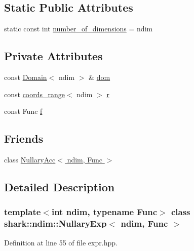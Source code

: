 \subsection*{Static Public Attributes}
\begin{DoxyCompactItemize}
\item 
static const int \hyperlink{classshark_1_1ndim_1_1_nullary_exp_ae586c786daf51061eb41615d208b2c12}{number\+\_\+of\+\_\+dimensions} = ndim
\end{DoxyCompactItemize}
\subsection*{Private Attributes}
\begin{DoxyCompactItemize}
\item 
const \hyperlink{classshark_1_1ndim_1_1_domain}{Domain}$<$ ndim $>$ \& \hyperlink{classshark_1_1ndim_1_1_nullary_exp_a4af666c034e0035ca4a9c4f8cf2f2ea2}{dom}
\item 
const \hyperlink{structshark_1_1ndim_1_1coords__range}{coords\+\_\+range}$<$ ndim $>$ \hyperlink{classshark_1_1ndim_1_1_nullary_exp_a2ab3c895de1618318f8864c90cd7b21e}{r}
\item 
const Func \hyperlink{classshark_1_1ndim_1_1_nullary_exp_a30f367c05cd7978aedec0a99ca82ed0e}{f}
\end{DoxyCompactItemize}
\subsection*{Friends}
\begin{DoxyCompactItemize}
\item 
class \hyperlink{classshark_1_1ndim_1_1_nullary_exp_aae3b9819be1b386ed4bb69e9a1e44726}{Nullary\+Acc$<$ ndim, Func $>$}
\end{DoxyCompactItemize}


\subsection{Detailed Description}
\subsubsection*{template$<$int ndim, typename Func$>$\newline
class shark\+::ndim\+::\+Nullary\+Exp$<$ ndim, Func $>$}



Definition at line 55 of file expr.\+hpp.



